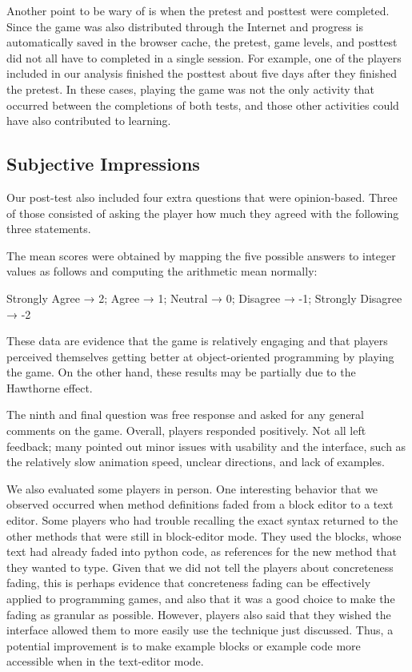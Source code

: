 \documentclass[12pt,notitlepage]{article}
\begin{document}
Another point to be wary of is when the pretest and posttest were completed.
Since the game was also distributed through the Internet and progress is
automatically saved in the browser cache, the pretest, game levels, and
posttest did not all have to completed in a single session. For example, one of
the players included in our analysis finished the posttest about five days
after they finished the pretest. In these cases, playing the game was not the
only activity that occurred between the completions of both tests, and those
other activities could have also contributed to learning.


\subsection{Subjective Impressions}

Our post-test also included four extra questions that were opinion-based.
Three of those consisted of asking the player how much they agreed with
the following three statements.



The mean scores were obtained by mapping the five possible answers to integer
values as follows and computing the arithmetic mean normally:\\
\centerline{Strongly Agree → 2; Agree → 1; Neutral → 0; Disagree → -1; Strongly Disagree → -2}

These data are evidence that the game is relatively engaging and that players
perceived themselves getting better at object-oriented programming by playing
the game. On the other hand, these results may be partially due to the
Hawthorne effect.

The ninth and final question was free response and asked for any general
comments on the game. Overall, players responded positively. Not all left
feedback; many pointed out minor issues with usability and the interface,
such as the relatively slow animation speed, unclear directions, and lack
of examples.

We also evaluated some players in person.
One interesting behavior that we observed occurred when method definitions
faded from a block editor to a text editor. Some players who had trouble
recalling the exact syntax returned to the other methods that were still in
block-editor mode. They used the blocks, whose text had already faded into
python code, as references for the new method that they wanted to type. Given
that we did not tell the players about concreteness fading, this is perhaps
evidence that concreteness fading can be effectively applied to programming
games, and also that it was a good choice to make the fading as granular as
possible. However, players also said that they wished the interface allowed
them to more easily use the technique just discussed. Thus, a potential
improvement is to make example blocks or example code more accessible when
in the text-editor mode.
\end{document}
